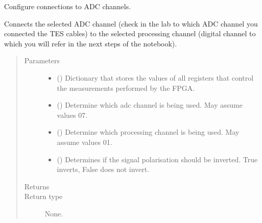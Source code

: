 \documentclass[letterpaper,10pt,english]{sphinxmanual}
\begin{document}

\begin{fulllineitems}
\label{\detokenize{tes:tes.mca_control.configure_channels}}
\sphinxAtStartPar
Configure connections to ADC channels.

\sphinxAtStartPar
Connects the selected ADC channel (check in the lab to which
ADC channel you connected the TES cables) to the selected
processing channel (digital channel to which you will refer
in the next steps of the notebook).
\begin{quote}\begin{description}
\item[{Parameters}] \leavevmode\begin{itemize}
\item {} 
\sphinxAtStartPar
{} () \textendash{} Dictionary that stores the values of all registers that control
the measurements performed by the FPGA.

\item {} 
\sphinxAtStartPar
{} () \textendash{} Determine which adc channel is being used.
May assume values 0\sphinxhyphen{}7.

\item {} 
\sphinxAtStartPar
{} () \textendash{} Determine which processing channel is being used.
May assume values 0\sphinxhyphen{}1.

\item {} 
\sphinxAtStartPar
{} () \textendash{} Determines if the signal polarisation should be inverted.
True inverts, False does not invert.

\end{itemize}

\item[{Returns}] \leavevmode
\sphinxAtStartPar


\item[{Return type}] \leavevmode
\sphinxAtStartPar
None.

\end{description}\end{quote}

\end{fulllineitems}
\end{document}
